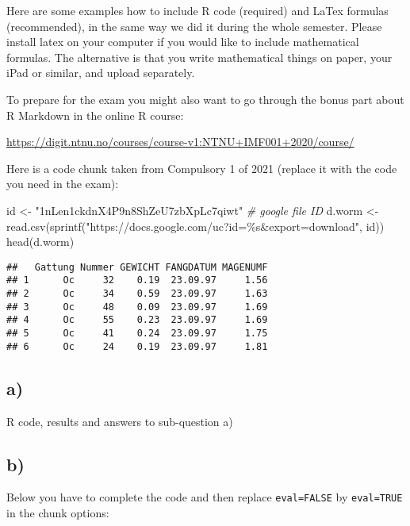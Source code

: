 \documentclass[
]{article}
\newenvironment{Shaded}{\begin{snugshade}}{\end{snugshade}}
\newcommand{\CommentTok}[1]{\textcolor[rgb]{0.56,0.35,0.01}{\textit{#1}}}
\newcommand{\FunctionTok}[1]{\textcolor[rgb]{0.00,0.00,0.00}{#1}}
\newcommand{\NormalTok}[1]{#1}
\newcommand{\OtherTok}[1]{\textcolor[rgb]{0.56,0.35,0.01}{#1}}
\newcommand{\StringTok}[1]{\textcolor[rgb]{0.31,0.60,0.02}{#1}}
\begin{document}
Here are some examples how to include R code (required) and LaTex
formulas (recommended), in the same way we did it during the whole
semester. Please install latex on your computer if you would like to
include mathematical formulas. The alternative is that you write
mathematical things on paper, your iPad or similar, and upload
separately.

To prepare for the exam you might also want to go through the bonus part
about R Markdown in the online R course:

\url{https://digit.ntnu.no/courses/course-v1:NTNU+IMF001+2020/course/}

Here is a code chunk taken from Compulsory 1 of 2021 (replace it with
the code you need in the exam):

\begin{Shaded}
\begin{Highlighting}[]
\NormalTok{id }\OtherTok{\textless{}{-}} \StringTok{"1nLen1ckdnX4P9n8ShZeU7zbXpLc7qiwt"} \CommentTok{\# google file ID}
\NormalTok{d.worm }\OtherTok{\textless{}{-}} \FunctionTok{read.csv}\NormalTok{(}\FunctionTok{sprintf}\NormalTok{(}\StringTok{"https://docs.google.com/uc?id=\%s\&export=download"}\NormalTok{, id))}
\FunctionTok{head}\NormalTok{(d.worm)}
\end{Highlighting}
\end{Shaded}

\begin{verbatim}
##   Gattung Nummer GEWICHT FANGDATUM MAGENUMF
## 1      Oc     32    0.19  23.09.97     1.56
## 2      Oc     34    0.59  23.09.97     1.63
## 3      Oc     48    0.09  23.09.97     1.69
## 4      Oc     55    0.23  23.09.97     1.69
## 5      Oc     41    0.24  23.09.97     1.75
## 6      Oc     24    0.19  23.09.97     1.81
\end{verbatim}

\hypertarget{a}{%
\subsection{a)}\label{a}}

R code, results and answers to sub-question a)

\hypertarget{b}{%
\subsection{b)}\label{b}}

Below you have to complete the code and then replace \texttt{eval=FALSE}
by \texttt{eval=TRUE} in the chunk options:
\end{document}
